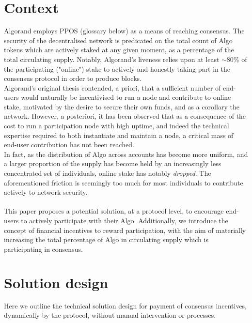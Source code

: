 \documentclass[11pt,a4paper]{article}
\begin{document}
\pagebreak

\section{Context}
Algorand employs \gls{PPOS} (glossary below) as a means of reaching consensus. The security of the decentralised network 
is predicated on the total count of Algo tokens which are actively staked at any given moment, as a percentage of the 
total circulating supply. Notably, Algorand's liveness relies upon at least $\sim$80\% of the participating ("online") 
stake to actively and honestly taking part in the consensus protocol in order to produce blocks. \\ 

Algorand's original thesis contended, a priori, that a sufficient number of end-users would naturally be incentivised to 
run a node and contribute to online stake, motivated by the desire to secure their own funds, and as a corollary the 
network. However, a posteriori, it has been observed that as a consequence of the cost to run a participation node with 
high uptime, and indeed the technical expertise required to both instantiate and maintain a node, a critical mass of 
end-user contribution has not been reached. \\

In fact, as the distribution of Algo across accounts has become more uniform, and a larger proportion of the supply has 
become held by an increasingly less concentrated set of individuals, online stake has notably \emph{dropped}. The 
aforementioned friction is seemingly too much for most individuals to contribute actively to network security. \\ \\

This paper proposes a potential solution, at a protocol level, to encourage end-users to actively participate with their 
Algo. Additionally, we introduce the concept of financial incentives to reward participation, with the aim of materially 
increasing the total percentage of Algo in circulating supply which is participating in consensus. 

\pagebreak

\section{Solution design}
Here we outline the technical solution design for payment of consensus incentives, dynamically by the protocol, without 
manual intervention or processes. 
\end{document}
